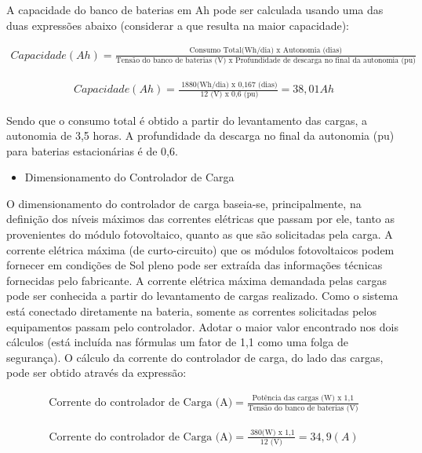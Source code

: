 A capacidade do banco de baterias em Ah pode ser calculada usando uma das duas expressões abaixo (considerar a que resulta na maior capacidade):

\begin{eqnarray}
Capacidade (Ah) = \frac{\text{Consumo Total(Wh/dia) x Autonomia (dias)} }{\text{Tensão do banco de baterias (V) x Profundidade de descarga no final da autonomia (pu)}}
\end{eqnarray}

\begin{eqnarray}
Capacidade (Ah) = \frac{\text{ 1880(Wh/dia) x 0,167 (dias)} }{\text{ 12 (V) x 0,6 (pu)}} =  38,01 Ah
\end{eqnarray}

Sendo que o consumo total é obtido a partir do levantamento das cargas, a autonomia de 3,5 horas. A profundidade da descarga no final da autonomia (pu) para baterias estacionárias é de 0,6.

\begin{itemize}
\item Dimensionamento do Controlador de Carga
\end{itemize}

		O dimensionamento do controlador de carga baseia-se, principalmente, na definição dos níveis máximos das correntes elétricas que passam por ele, tanto as provenientes do módulo fotovoltaico, quanto as que são solicitadas pela carga. A corrente elétrica máxima (de curto-circuito) que os módulos fotovoltaicos podem fornecer em condições de Sol pleno pode ser extraída das informações técnicas fornecidas pelo fabricante. A corrente elétrica máxima demandada pelas cargas pode ser conhecida a partir do levantamento de cargas realizado. Como o sistema está conectado diretamente na bateria, somente as correntes solicitadas pelos equipamentos passam pelo controlador. Adotar o maior valor encontrado nos dois cálculos (está incluída nas fórmulas um fator de 1,1 como uma folga de segurança).
        O cálculo da corrente do controlador de carga, do lado das cargas, pode ser obtido através da expressão:

\begin{eqnarray}
\text{Corrente do controlador de Carga (A)} = \frac{\text{Potência das cargas (W) x 1,1}}{\text{Tensão do banco de baterias (V)}}
\end{eqnarray}

\begin{eqnarray}
\text{Corrente do controlador de Carga (A)} = \frac{\text{ 380(W) x 1,1}}{\text{12 (V)}} = 34,9 (A)
\end{eqnarray}

